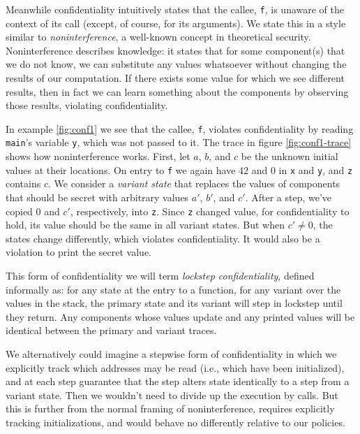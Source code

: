 \documentclass[acmsmall,review,anonymous]{acmart}\settopmatter{printfolios=true,printccs=false,printacmref=false}
\begin{document}
Meanwhile confidentiality intuitively states that the callee, {\tt f}, is unaware
of the context of its call (except, of course, for its arguments).
We state this in a style similar to {\em noninterference}, a well-known concept in theoretical
security. Noninterference describes knowledge: it states that for some component(s)
that we do not know, we can substitute any values whatsoever without changing the results
of our computation. If there exists some value for which we see different results, then
in fact we can learn something about the components by observing those results, violating
confidentiality.

In example \ref{fig:conf1} we see that the callee, {\tt f}, violates confidentiality
by reading {\tt main}'s variable {\tt y}, which was not passed to it. The trace
in figure \ref{fig:conf1-trace} shows how noninterference works. 
First, let \(a\),
\(b\), and \(c\) be the unknown initial values at their locations. On entry to {\tt f}
we again have 42 and 0 in {\tt x} and {\tt y}, and {\tt z} contains \(c\). We consider a
{\em variant state} that replaces the values of components that should be secret with
arbitrary values \(a'\), \(b'\), and \(c'\). After a step, we've copied 0 and \(c'\),
respectively, into {\tt z}. Since {\tt z} changed value, for confidentiality to hold,
its value should be the same in all variant states. But when \(c' \not = 0\), the
states change differently, which violates confidentiality. It would also be a violation
to print the secret value.

This form of confidentiality we will term {\em lockstep confidentiality}, defined informally
as: for any state at the entry to a function, for any variant over the values in the stack,
the primary state and its variant will step in lockstep until they return. Any components
whose values update and any printed values will be identical between the primary and variant
traces.

We alternatively could imagine a stepwise form of confidentiality in which we explicitly
track which addresses may be read (i.e., which have been initialized), and at each step
guarantee that the step alters state identically to a step from a variant state. Then we
wouldn't need to divide up the execution by calls. But this is further from the normal
framing of noninterference, requires explicitly tracking initializations, and would behave
no differently relative to our policies.
\end{document}
